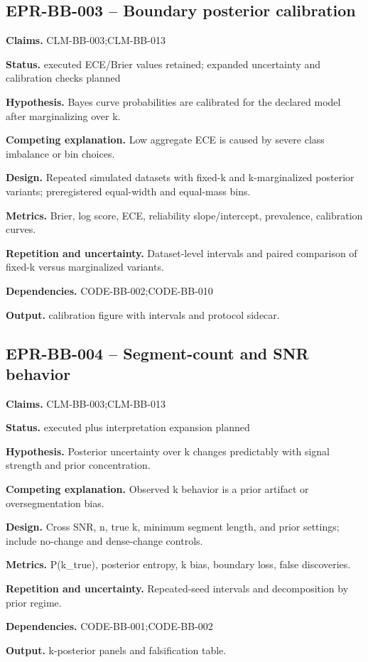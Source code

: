 \subsection{EPR-BB-003 -- Boundary posterior calibration}
\textbf{Claims.} CLM-BB-003;CLM-BB-013\par
\textbf{Status.} executed ECE/Brier values retained; expanded uncertainty and calibration checks planned\par
\textbf{Hypothesis.} Bayes curve probabilities are calibrated for the declared model after marginalizing over k.\par
\textbf{Competing explanation.} Low aggregate ECE is caused by severe class imbalance or bin choices.\par
\textbf{Design.} Repeated simulated datasets with fixed-k and k-marginalized posterior variants; preregistered equal-width and equal-mass bins.\par
\textbf{Metrics.} Brier, log score, ECE, reliability slope/intercept, prevalence, calibration curves.\par
\textbf{Repetition and uncertainty.} Dataset-level intervals and paired comparison of fixed-k versus marginalized variants.\par
\textbf{Dependencies.} CODE-BB-002;CODE-BB-010\par
\textbf{Output.} calibration figure with intervals and protocol sidecar.

\subsection{EPR-BB-004 -- Segment-count and SNR behavior}
\textbf{Claims.} CLM-BB-003;CLM-BB-013\par
\textbf{Status.} executed plus interpretation expansion planned\par
\textbf{Hypothesis.} Posterior uncertainty over k changes predictably with signal strength and prior concentration.\par
\textbf{Competing explanation.} Observed k behavior is a prior artifact or oversegmentation bias.\par
\textbf{Design.} Cross SNR, n, true k, minimum segment length, and prior settings; include no-change and dense-change controls.\par
\textbf{Metrics.} P(k\_true), posterior entropy, k bias, boundary loss, false discoveries.\par
\textbf{Repetition and uncertainty.} Repeated-seed intervals and decomposition by prior regime.\par
\textbf{Dependencies.} CODE-BB-001;CODE-BB-002\par
\textbf{Output.} k-posterior panels and falsification table.

